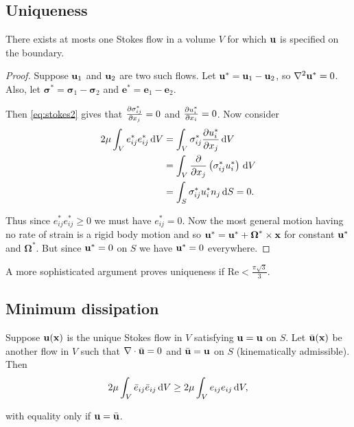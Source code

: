 \documentclass{notes}
\newcommand{\bo}{\boldsymbol{\Omega}}
\newcommand{\Rey}{\mathrm{Re}}
\newcommand{\bs}{\boldsymbol{\sigma}}
\newcommand{\e}{\mathbf{e}}
\theoremstyle{plain}
\begin{document}
\subsection{Uniqueness}

There exists at mosts one Stokes flow in a volume $V$ for which $\mathbf{u}$
is specified on the boundary.

\begin{proof}
Suppose $\mathbf{u}_1$ and $\mathbf{u}_2$ are two such flows.  Let $\mathbf{u}^\ast = \mathbf{u}_1 - \mathbf{u}_2$,
so $\nabla^2 \mathbf{u}^\ast = 0$.  Also, let $\bs^\ast = \bs_1 - \bs_2$
and $\e^\ast = \e_1 - \e_2$.

Then \eqref{eq:stokes2} gives that $\frac{\partial \sigma^\ast_{i j}}{\partial x_j} = 0$
and $\frac{\partial u^\ast_i}{\partial x_i} = 0$.  Now consider
\begin{align*}
2 \mu \int_V e^\ast_{i j} e^\ast_{i j}\, \mathrm{d} V &=
\int_V \sigma^\ast_{i j} \frac{\partial u^\ast_i}{\partial x_j}\, \mathrm{d} V \\
&= \int_V \frac{\partial }{\partial x_j} \left( \sigma^\ast_{i j} u^\ast_i \right)\, \mathrm{d} V \\
&= \int_S \sigma^\ast_{i j} u_i^\ast n_j\, \mathrm{d} S = 0.
\end{align*}

Thus since $e^\ast_{i j} e^\ast_{i j} \ge 0$ we must have $e^\ast_{i
  j} = 0$.  Now the most general motion having no rate of strain is a
rigid body motion and so $\vu^\ast = \vu^\ast +
\bo^\ast \times \vx$ for constant $\mathbf{u}^\ast$ and
$\bo^\ast$.  But since $\mathbf{u}^\ast = 0$ on $S$ we have
$\mathbf{u}^\ast = 0$ everywhere.
\end{proof}

A more sophisticated argument proves uniqueness if $\Rey <
\frac{\pi \sqrt{3}}{3}$.

\subsection{Minimum dissipation}

Suppose $\mathbf{u}(\mathbf{x})$ is the unique Stokes flow in $V$ satisfying $\mathbf{u} = \mathbf{u}$
on $S$. Let $\Bar{\mathbf{u}}(\mathbf{x})$ be another flow in $V$ such that $
\nabla \cdot \Bar{\mathbf{u}} = 0$ and $\Bar{\mathbf{u}} = \mathbf{u}$ on $S$ (kinematically
admissible).  Then
\[
2 \mu \int_V \Bar{e}_{i j} \Bar{e}_{i j}\, \mathrm{d} V
\ge 2 \mu \int_V e_{i j} e_{i j}\, \mathrm{d} V,
\]

with equality only if $\mathbf{u} = \Bar{\mathbf{u}}$.
\end{document}

